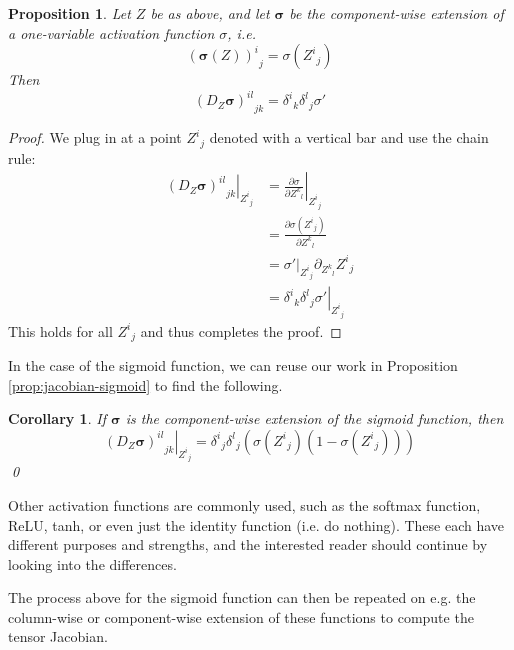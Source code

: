 \documentclass[a4paper]{article}
\theoremstyle{plain} %
\newtheorem{corollary}[theorem]{Corollary}
\newtheorem{proposition}[theorem]{Proposition}
\theoremstyle{definition} %
\numberwithin{equation}{subsection}
\newcommand{\del}[2]{\frac{\partial #1}{\partial #2}}
\newcommand{\vsigma}{{\bm{\sigma}}} %
\begin{document}
\begin{proposition}
  Let $Z$ be as above, and let $\vsigma$ be the component-wise extension of a one-variable activation function $\sigma$, i.e. 
  \[ {(\vsigma(Z))^i}_j = \sigma({Z^i}_j)\]
  Then 
  \[ {(D_Z \vsigma )^{il}}_{jk} = {\delta^i}_k {\delta^l}_j \sigma'\]
\end{proposition}
\begin{proof}
  We plug in at a point ${Z^i}_j$ denoted with a vertical bar and use the chain rule:
  \begin{align*}
    \left.{(D_Z \vsigma )^{il}}_{jk}\right\vert_{{Z^i}_j} &= \left.\del{\sigma}{{Z^k}_l} \right\vert_{{Z^i}_j}\\
     &= \del{\sigma({Z^i}_j)}{{Z^k}_l}\\
     &= \left.\sigma'\right\vert_{{Z^i}_j} \partial_{{Z^k}_l}{Z^i}_j \\
     &= \left.{\delta^i}_k {\delta^l}_j \sigma' \right\vert_{{Z^i}_j}
  \end{align*}
  This holds for all ${Z^i}_j$ and thus completes the proof.
\end{proof}

In the case of the sigmoid function, we can reuse our work in Proposition \ref{prop:jacobian-sigmoid} to find the following.
\begin{corollary} \label{prop:nn-tensor-DS}
  If $\vsigma$ is the component-wise extension of the sigmoid function, then 
  \[\left. {(D_Z \vsigma )^{il}}_{jk}\right\vert_{{Z^i}_j} = {\delta^i}_j {\delta^l}_j (\sigma({Z^i}_j)(1- \sigma({Z^i}_j)))\]
  \qed
\end{corollary}

Other activation functions are commonly used, such as the softmax function, ReLU, tanh, or even just the identity function (i.e. do nothing). These each have different purposes and strengths, and the interested reader should continue by looking into the differences.

The process above for the sigmoid function can then be repeated on e.g. the column-wise or component-wise extension of these functions to compute the tensor Jacobian.
\end{document}

